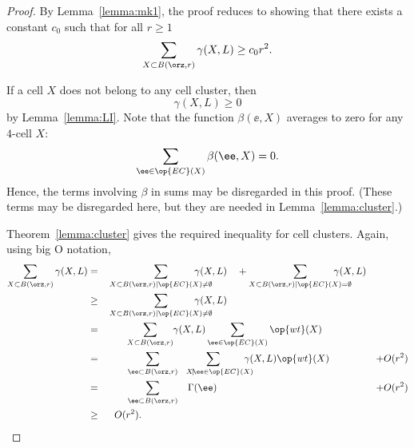 \begin{proof} 
  By Lemma~\ref{lemma:mk1}, the proof reduces to showing that there
  exists a constant $c_0$ such that for all $r\ge1$
\[
\sum_{X\subset B(\orz,r)} \gamma(X,L) \ge c_0 r^2.
\]

If a cell $X$ does not belong to any cell cluster, then
\[ 
\gamma(X,L)\ge 0
\] 
by Lemma~\ref{lemma:LI}.  Note that the function
$\beta(\ee,X)$ averages to zero for any $4$-cell $X$:
\[  
\sum_{\ee\in \op{EC}(X)} \beta(\ee,X) = 0.
\] 
Hence, the terms involving $\beta$ in sums may be disregarded in this
proof.  (These terms may be disregarded here, but they are needed in
 Lemma~\ref{lemma:cluster}.)

Theorem~\ref{lemma:cluster} gives the required inequality for cell
clusters.  Again, using big O notation,
\begin{alignat*}{8}
\sum_{X\subset B(\orz,r)} \gamma(X,L) 
&=&&\sum_{X\subset B(\orz,r)\mid \op{EC}(X)\ne\emptyset} \hspace{-2em}\gamma(X,L) \quad +
\sum_{X\subset B(\orz,r)\mid \op{EC}(X)=\emptyset} \hspace{-2em}\gamma(X,L) \vspace{6pt}\\
&\ge &&\sum_{X\subset B(\orz,r)\mid \op{EC}(X)\ne\emptyset} \hspace{-2em}\gamma(X,L)\vspace{6pt} \\
&= &&\sum_{\hspace{1.8em}X\subset B(\orz,r)\hspace{1.8em}}\hspace{-2em}\gamma(X,L)\sum_{\ee \in \op{EC}(X)}\op{wt}(X) \vspace{6pt}\\
&= &&\sum_{\hspace{1.85em}\ee\subset B(\orz,r)\hspace{1.85em}}\hspace{-2.5em}\sum_{~~~~X\!\mid\! \ee \in \op{EC}(X)}\hspace{-1.1em}\gamma(X,L)\op{wt}(X) &+ O(r^2)\vspace{6pt}\\
&= &&\sum_{\hspace{1.85em}\ee\subset B(\orz,r)\hspace{1.85em}}\hspace{-1em}\Gamma(\ee) &+ O(r^2)\vspace{6pt}\\
&\ge&& ~~O(r^2).
\end{alignat*}
\end{proof}

